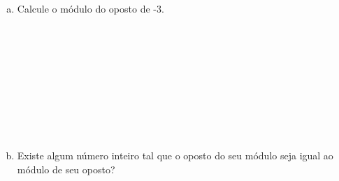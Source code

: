 \documentclass[a4paper,14pt]{article}
\begin{document}
\begin{multicols}{2}
\begin{enumerate}
\begin{enumerate}[a)]
				\item Calcule o módulo do oposto de -3. \\\\\\\\\\\\\\\\\\\\
				\item Existe algum número inteiro tal que o oposto do seu módulo seja igual ao módulo de seu oposto? \\\\\\\\\\\\\\\\\\\\
			\end{enumerate}
		\end{enumerate}
		$~$ \\ $~$ \\ $~$ \\ $~$ \\ $~$ \\ $~$ \\ $~$ \\ $~$ \\ $~$ \\ $~$ \\ $~$ \\ $~$ \\ $~$ \\ $~$ \\ $~$
	\end{multicols}
\end{document}
